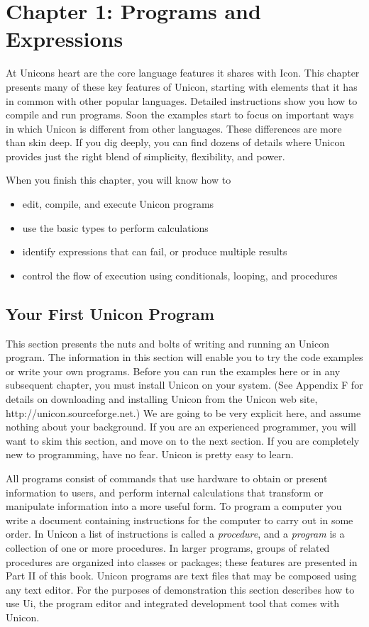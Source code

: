 \clearpage
\section{Chapter 1: Programs and Expressions}
At Unicon{\textquotesingle}s heart are the core language features it
shares with Icon. This chapter presents many of these key features of
Unicon, starting with elements that it has in common with other popular
languages. Detailed instructions show you how to compile
and run programs. Soon the examples start to focus on
important ways in which Unicon is different from other languages. These
differences are more than skin deep. If you dig deeply, you can find
dozens of details where Unicon provides just the right blend of
simplicity, flexibility, and power.

When you finish this chapter, you will know how to

\begin{itemize}
\item edit, compile, and execute Unicon programs
\item use the basic types to perform calculations
\item identify expressions that can fail, or
produce multiple results
\item control the flow of execution using conditionals, looping, and
procedures
\end{itemize}
\subsection{Your First Unicon Program}
This section presents the nuts and bolts of writing and running an
Unicon program. The information in this section will enable you to try
the code examples or write your own programs. Before you can run the
examples here or in any subsequent chapter, you must
install Unicon on your system. (See Appendix F for
details on downloading and installing Unicon from the Unicon web site,
http://unicon.sourceforge.net.) We are going to be very explicit here,
and assume nothing about your background. If you are an experienced
programmer, you will want to skim this section, and move on to the next
section. If you are completely new to programming, have no fear. Unicon
is pretty easy to learn.

All programs consist of commands that use hardware to obtain or present
information to users, and perform internal calculations that transform
or manipulate information into a more useful form. To program a
computer you write a document containing instructions for the computer
to carry out in some order. In Unicon a list of instructions is called
a \textit{procedure}, and a
\textit{program} is a collection of one or more
procedures. In larger programs, groups of related procedures are
organized into classes or packages; these features are presented in
Part II of this book. Unicon programs are text files that may be
composed using any text editor. For the purposes of
demonstration this section describes how to use Ui, the
program editor and integrated development tool that comes with Unicon.

